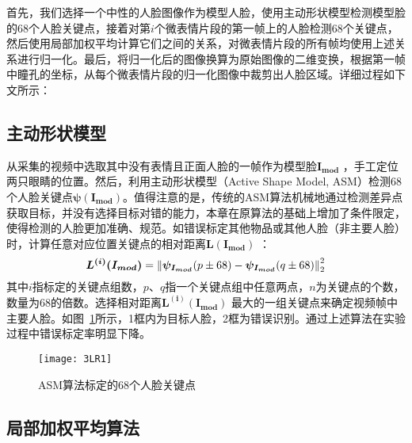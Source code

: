首先，我们选择一个中性的人脸图像作为模型人脸，使用主动形状模型检测模型脸的68个人脸关键点，接着对第$i$个微表情片段的第一帧上的人脸检测68个关键点，然后使用局部加权平均计算它们之间的关系，对微表情片段的所有帧均使用上述关系进行归一化。最后，将归一化后的图像换算为原始图像的二维变换，根据第一帧中瞳孔的坐标，从每个微表情片段的归一化图像中裁剪出人脸区域。详细过程如下文所示：

\subsection{主动形状模型}

从采集的视频中选取其中没有表情且正面人脸的一帧作为模型脸$\boldsymbol{I_{mod}}$ ，手工定位两只眼睛的位置。然后，利用主动形状模型（Active Shape Model, ASM）检测68个人脸关键点$\boldsymbol{\psi(I_{mod})}$\citep{cootes1995active}。值得注意的是，传统的ASM算法机械地通过检测差异点获取目标，并没有选择目标对错的能力，本章在原算法的基础上增加了条件限定，使得检测的人脸更加准确、规范。如错误标定其他物品或其他人脸（非主要人脸）时，计算任意对应位置关键点的相对距离$\boldsymbol{L(I_{mod})}$ ：
\begin{equation}
    \label{eq2}
    \boldsymbol{L^{(i)}(I_{mod})}=\left \| \boldsymbol{\psi_{I_{mod}}}(p\pm 68)-\boldsymbol{\psi_{I_{mod}}}(q\pm 68) \right \|_{2}^{2\displaystyle }
\end{equation}
其中$i$指标定的关键点组数，$p$、$q$指一个关键点组中任意两点，$n$为关键点的个数，数量为68的倍数。选择相对距离$\boldsymbol{L^{(i)}(I_{mod})}$ 最大的一组关键点来确定视频帧中主要人脸。如图~\ref{fig12}所示，1框内为目标人脸，2框为错误识别。通过上述算法在实验过程中错误标定率明显下降。

\begin{figure}[!htbp]
\centering
\texttt{[image: 3LR1]}
\caption{ASM算法标定的68个人脸关键点}
\label{fig12}
\end{figure}

\subsection{局部加权平均算法}

